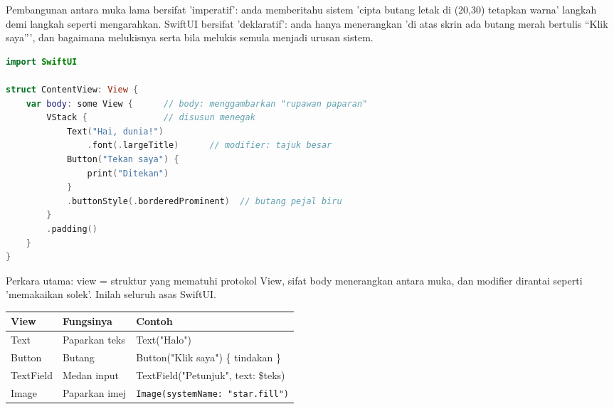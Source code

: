 


Pembangunan antara muka lama bersifat 'imperatif': anda memberitahu sistem 'cipta butang letak di (20,30) tetapkan warna' langkah demi langkah seperti mengarahkan. SwiftUI bersifat 'deklaratif': anda hanya menerangkan 'di atas skrin ada butang merah bertulis “Klik saya”', dan bagaimana melukisnya serta bila melukis semula menjadi urusan sistem.

\begin{lstlisting}[language=Swift]
import SwiftUI

struct ContentView: View {
    var body: some View {      // body: menggambarkan "rupawan paparan"
        VStack {               // disusun menegak
            Text("Hai, dunia!")
                .font(.largeTitle)      // modifier: tajuk besar
            Button("Tekan saya") {
                print("Ditekan")
            }
            .buttonStyle(.borderedProminent)  // butang pejal biru
        }
        .padding()
    }
}
\end{lstlisting}

Perkara utama: view = struktur yang mematuhi protokol View, sifat body menerangkan antara muka, dan modifier dirantai seperti 'memakaikan solek'. Inilah seluruh asas SwiftUI.


\begin{center}
\begin{tabularx}{\linewidth}{|X|X|X|}
\hline
\textbf{View} & \textbf{Fungsinya} & \textbf{Contoh} \tabularnewline
\hline
Text & Paparkan teks & Text("Halo") \tabularnewline
Button & Butang & Button("Klik saya") \{ tindakan \} \tabularnewline
TextField & Medan input & TextField("Petunjuk", text: \$teks) \tabularnewline
Image & Paparkan imej & \texttt{Image(systemName: "star.\allowbreak fill")} \tabularnewline
\hline
\end{tabularx}
\end{center}

